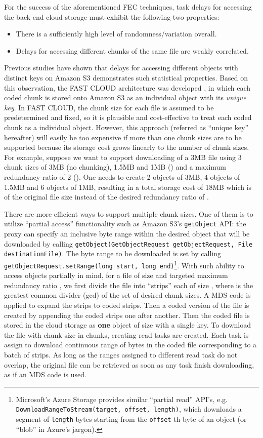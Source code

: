 \documentclass[journal]{IEEEtran}
\begin{document}
For the success of the aforementioned FEC techniques, task delays for accessing the back-end cloud storage must exhibit the following two properties: 
\begin{itemize}
\item
There is a sufficiently high level of randomness/variation overall.

\item 
Delays for accessing different chunks of the same file are weakly correlated.
\end{itemize}
Previous studies \cite{Garfinkel07anevaluation,fastcloud} have shown that delays for accessing different objects with distinct keys on Amazon S3 demonstrates such statistical properties. Based on this observation, the FAST CLOUD architecture was developed \cite{fastcloud}, in which each coded chunk is stored onto Amazon S3 as an individual object with its {\em unique key}. 
In FAST CLOUD, the chunk size for each file is assumed to be predetermined and fixed, so it is plausible and cost-effective to treat each coded chunk as a individual object. However, this approach (referred as ``unique key'' hereafter) will easily be too expensive if more than one chunk sizes are to be supported because its storage cost grows linearly to the number of chunk sizes. For example, suppose we want to support downloading of a 3MB file using 3 chunk sizes of 3MB (no chunking), 1.5MB and 1MB () and a maximum redundancy ratio of 2 (). One needs to create 2 objects of 3MB, 4 objects of 1.5MB and 6 objects of 1MB, resulting in a total storage cost of 18MB which is  of the original file size instead of the desired redundancy ratio of .

There are more efficient ways to support multiple chunk sizes. One of them is to 
 utilize ``partial access'' functionality such as Amazon S3's {\tt getObject} API: the proxy can specify an inclusive byte range within the desired object that will be downloaded by calling {\tt getObject(GetObjectRequest getObjectRequest, File destinationFile)}. The byte range to be downloaded is set by calling {\tt getObjectRequest.setRange(long start, long end)}\footnote{Microsoft's Azure Storage provides  similar ``partial read'' API's, e.g. {\tt DownloadRangeToStream(target, offset, length)}, which downloads a segment of {\tt length} bytes starting from the {\tt offset}-th byte of an object (or ``blob'' in Azure's jargon).}. With such ability to access objects partially in mind, for a file of size  and targeted maximum redundancy ratio , we first divide the file into ``strips'' each of size , where  is the greatest common divider (gcd) of the set of desired chunk sizes. A  MDS code is applied to expand the  strips to  coded strips. Then a coded version of the file is created by appending the coded strips one after another. Then the coded file is stored in the cloud storage as {\bf one} object of size  with a single key. 
To download the file with chunk size  in  chunks, creating  read tasks are created. Each task is assign to download continuous range of  bytes in the coded file corresponding to a batch of  strips. As long as the ranges assigned to different read task do not overlap, the original file can be retrieved as soon as any  task finish downloading, as if an  MDS code is used. 
\end{document}
